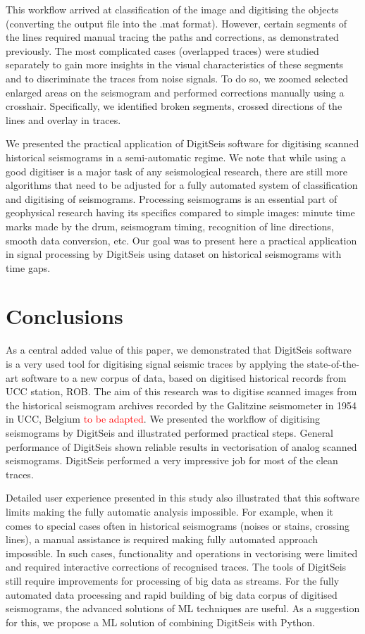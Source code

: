 \documentclass[informatics,article,submit,moreauthors,pdftex]{Definitions/mdpi}
\begin{document}
This workflow arrived at classification of the image and digitising the objects (converting the output file into the .mat format). However, certain segments of the lines required manual tracing the paths and corrections, as demonstrated previously. The most complicated cases (overlapped traces) were studied separately to gain more insights in the visual characteristics of these segments and to discriminate the traces from noise signals. To do so, we zoomed selected enlarged areas on the seismogram and performed corrections manually using a crosshair. Specifically, we identified broken segments, crossed directions of the lines and overlay in traces. 

We presented the practical application of DigitSeis software for digitising scanned historical seismograms in a semi-automatic regime. We note that while using a good digitiser is a major task of any seismological research, there are still more algorithms that need to be adjusted for a fully automated system of classification and digitising of seismograms. Processing seismograms is an essential part of geophysical research having its specifics compared to simple images: minute time marks made by the drum, seismogram timing, recognition of line directions, smooth data conversion, etc. Our goal was to present here a practical application in signal processing by DigitSeis using dataset on historical seismograms with time gaps.

\section{Conclusions}

As a central added value of this paper, we demonstrated that DigitSeis software is a very used tool for digitising signal seismic traces by applying the state-of-the-art software to a new corpus of data, based on digitised historical records from \ac{UCC} station, \ac{ROB}. The aim of this research was to digitise scanned images from the historical seismogram archives recorded by the Galitzine seismometer in 1954 in \ac{UCC}, Belgium \textcolor{red}{to be adapted}. We presented the workflow of digitising seismograms by DigitSeis and illustrated performed practical steps. General performance of DigitSeis shown reliable results in vectorisation of analog scanned seismograms. DigitSeis performed a very impressive job for most of the clean traces. 

Detailed user experience presented in this study also illustrated that this software limits making the fully automatic analysis impossible. For example, when it comes to special cases often in historical seismograms (noises or stains, crossing lines), a manual assistance is required making fully automated approach impossible. In such cases, functionality and operations in vectorising were limited and required interactive corrections of recognised traces. The tools of DigitSeis still require improvements for processing of big data as streams. For the fully automated data processing and rapid building of big data corpus of digitised seismograms, the advanced solutions of \ac{ML} techniques are useful. As a suggestion for this, we propose a \ac{ML} solution of combining DigitSeis with Python. 
\end{document}
